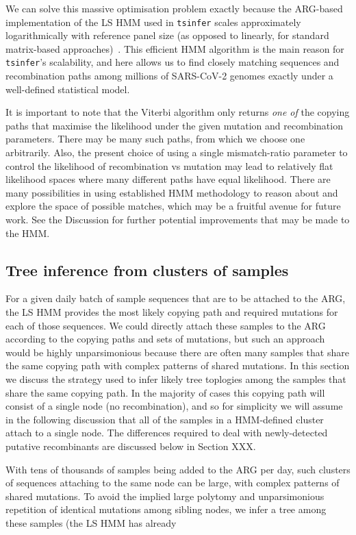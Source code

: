 \documentclass{article}
\begin{document}
We can solve this massive optimisation problem exactly because the ARG-based
implementation of the LS HMM used in \texttt{tsinfer} scales approximately
logarithmically with reference panel size (as opposed to linearly,
for standard matrix-based approaches)~\citep{Kelleher2019-ba}.
This efficient HMM algorithm is the main reason for \texttt{tsinfer}'s
scalability, and here allows us to find closely matching
sequences and recombination paths among millions of SARS-CoV-2
genomes exactly under a well-defined statistical model.

It is important to note that the Viterbi algorithm only returns
\emph{one of} the copying paths that maximise the likelihood under
 the given mutation and recombination parameters. There may be many
such paths, from which we choose one arbitrarily. Also, the
present choice of using a single mismatch-ratio parameter to control
the likelihood of recombination vs mutation may lead to relatively
flat likelihood spaces where many different paths have equal likelihood.
There are many possibilities in using established HMM methodology
to reason about and explore the space of possible matches, which may
be a fruitful avenue for future work. See the Discussion for further
potential improvements that may be made to the HMM.

\subsection{Tree inference from clusters of samples}
For a given daily batch of sample sequences that are to be attached to the
ARG, the LS HMM provides the most likely copying path and required mutations
for each of those sequences. We could directly attach these samples to
the ARG according to the copying paths and sets of mutations, but
such an approach would be highly unparsimonious because there are
often many samples that share the same copying path with
complex patterns of shared mutations.
In this section we discuss the strategy used to infer likely tree
toplogies among the samples that share the same copying path.
In the majority of cases this copying path will consist of a single
node (no recombination), and so for simplicity we will assume in the
following discussion that all of the samples in a HMM-defined cluster
attach to a single node. The differences required to deal with
newly-detected putative recombinants are discussed below
in Section XXX.

With tens of thousands of samples being added to the ARG per day,
such clusters of sequences attaching to the same node
can be large, with complex patterns of shared mutations.
To avoid the implied large polytomy and unparsimonious
repetition of identical mutations among sibling nodes, we
infer a tree among these samples (the LS HMM has already
\end{document}

